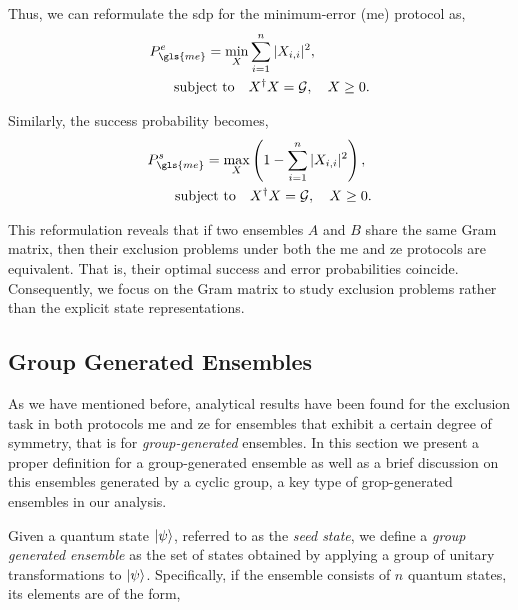 \documentclass[12pt,letterpaper]{article}
\begin{document}
Thus, we can reformulate the \gls{sdp} for the minimum-error (\gls{me}) protocol as,
\begin{align*}
	P_{\gls{me}}^e = \min_{X} &\sum_{i=1}^n |X_{i,i}|^2, \\
	\text{subject to} \quad & X^\dagger X = \mathcal{G}, \quad X \geq 0.
\end{align*}

Similarly, the success probability becomes,
\begin{align*}
	P_{\gls{me}}^s = \max_{X} &\left( 1 - \sum_{i=1}^n |X_{i,i}|^2 \right), \\
	\text{subject to} \quad & X^\dagger X = \mathcal{G}, \quad X \geq 0.
\end{align*}

This reformulation reveals that if two ensembles $A$ and $B$ share the same Gram matrix, then their exclusion problems under both the \gls{me} and \gls{ze} protocols are equivalent. That is, their optimal success and error probabilities coincide. Consequently, we focus on the Gram matrix to study exclusion problems rather than the explicit state representations.


\subsection{Group Generated Ensembles}\label{sectionGroupGeneratedEnsemble}

As we have mentioned before, analytical results have been found for the exclusion task in both protocols \gls{me} and \gls{ze} for ensembles that exhibit a certain degree of symmetry\cite{MainPaper}, that is for \emph{group-generated} ensembles. In this section we present a proper definition for a group-generated ensemble as well as a brief discussion on this ensembles generated by a cyclic group, a key type of grop-generated ensembles in our analysis.

Given a quantum state $\ket{\psi}$, referred to as the \emph{seed state}, we define a \emph{group generated ensemble} as the set of states obtained by applying a group of unitary transformations to $\ket{\psi}$. Specifically, if the ensemble consists of $n$ quantum states, its elements are of the form,
\end{document}
